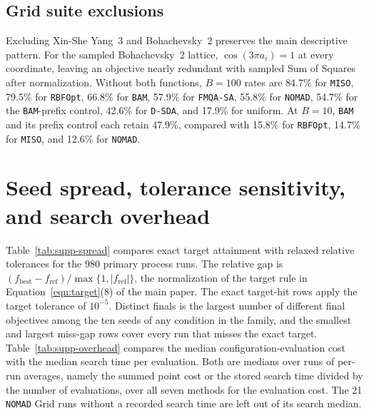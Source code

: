 \subsection{Grid suite exclusions}
Excluding Xin-She Yang~3 and Bohachevsky~2 preserves the main descriptive pattern.
For the sampled Bohachevsky~2 lattice, \(\cos(3\pi a_i)=1\) at every coordinate, leaving an objective nearly redundant with sampled Sum of Squares after normalization.
Without both functions, \(B=100\) rates are 84.7\% for \texttt{MISO}, 79.5\% for \texttt{RBFOpt}, 66.8\% for \texttt{BAM}, 57.9\% for \texttt{FMQA-SA}, 55.8\% for \texttt{NOMAD}, 54.7\% for the \texttt{BAM}-prefix control, 42.6\% for \texttt{D-SDA}, and 17.9\% for uniform.
At \(B=10\), \texttt{BAM} and its prefix control each retain 47.9\%, compared with 15.8\% for \texttt{RBFOpt}, 14.7\% for \texttt{MISO}, and 12.6\% for \texttt{NOMAD}.




\FloatBarrier
\section{Seed spread, tolerance sensitivity, and search overhead}\label{sec:supp-spread-overhead}
Table~\ref{tab:supp-spread} compares exact target attainment with relaxed relative tolerances for the 980 primary process runs.
The relative gap is \((f_{\mathrm{best}}-f_{\mathrm{ref}})/\max\{1,|f_{\mathrm{ref}}|\}\), the normalization of the target rule in Equation~\ifdefined\manuscriptwithsupplement\eqref{eqn:target}\else(8)\fi{} of the main paper.
The exact target-hit rows apply the target tolerance of \(10^{-5}\).
Distinct finals is the largest number of different final objectives among the ten seeds of any condition in the family, and the smallest and largest miss-gap rows cover every run that misses the exact target.
Table~\ref{tab:supp-overhead} compares the median configuration-evaluation cost with the median search time per evaluation.
Both are medians over runs of per-run averages, namely the summed point cost or the stored search time divided by the number of evaluations, over all seven methods for the evaluation cost.
The 21 \texttt{NOMAD} Grid runs without a recorded search time are left out of its search median.


